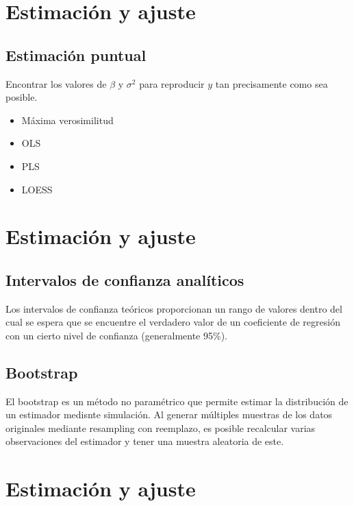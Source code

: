\documentclass[
  letterpaper,
  DIV=11,
  numbers=noendperiod]{scrreprt}
\begin{document}
\section{Estimación y ajuste}\label{estimaciuxf3n-y-ajuste-2}

\subsection{Estimación puntual}\label{estimaciuxf3n-puntual-1}

Encontrar los valores de \(\beta\) y \(\sigma^2\) para reproducir \(y\)
tan precisamente como sea posible.

\begin{itemize}
\item
  Máxima verosimilitud
\item
  OLS
\item
  PLS
\item
  LOESS
\end{itemize}

\section{Estimación y ajuste}\label{estimaciuxf3n-y-ajuste-3}

\subsection{Intervalos de confianza
analíticos}\label{intervalos-de-confianza-analuxedticos}

Los intervalos de confianza teóricos proporcionan un rango de valores
dentro del cual se espera que se encuentre el verdadero valor de un
coeficiente de regresión con un cierto nivel de confianza (generalmente
95\%).

\subsection{Bootstrap}\label{bootstrap}

El bootstrap es un método no paramétrico que permite estimar la
distribución de un estimador medisnte simulación. Al generar múltiples
muestras de los datos originales mediante resampling con reemplazo, es
posible recalcular varias observaciones del estimador y tener una
muestra aleatoria de este.

\section{Estimación y ajuste}\label{estimaciuxf3n-y-ajuste-4}
\end{document}
